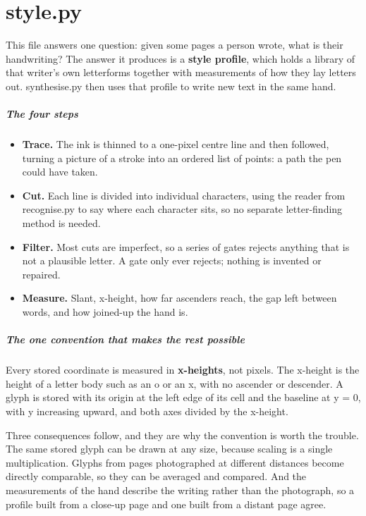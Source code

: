 
\chapter{style.py}
This file answers one question: given some pages a person wrote, what is their handwriting? The answer it produces is a \textbf{style profile}, which holds a library of that writer's own letterforms together with measurements of how they lay letters out. synthesise.py then uses that profile to write new text in the same hand.


\paragraph{The four steps}

\begin{itemize}\setlength\itemsep{0pt}
  \item \textbf{Trace.} The ink is thinned to a one-pixel centre line and then followed, turning a picture of a stroke into an ordered list of points: a path the pen could have taken.
  \item \textbf{Cut.} Each line is divided into individual characters, using the reader from recognise.py to say where each character sits, so no separate letter-finding method is needed.
  \item \textbf{Filter.} Most cuts are imperfect, so a series of gates rejects anything that is not a plausible letter. A gate only ever rejects; nothing is invented or repaired.
  \item \textbf{Measure.} Slant, x-height, how far ascenders reach, the gap left between words, and how joined-up the hand is.
\end{itemize}

\paragraph{The one convention that makes the rest possible}
Every stored coordinate is measured in \textbf{x-heights}, not pixels. The x-height is the height of a letter body such as an o or an x, with no ascender or descender. A glyph is stored with its origin at the left edge of its cell and the baseline at y = 0, with y increasing upward, and both axes divided by the x-height.

Three consequences follow, and they are why the convention is worth the trouble. The same stored glyph can be drawn at any size, because scaling is a single multiplication. Glyphs from pages photographed at different distances become directly comparable, so they can be averaged and compared. And the measurements of the hand describe the writing rather than the photograph, so a profile built from a close-up page and one built from a distant page agree.


